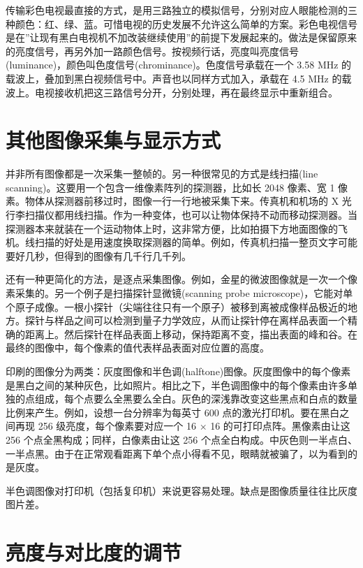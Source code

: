 传输彩色电视最直接的方式，是用三路独立的模拟信号，分别对应人眼能检测的三种颜色：红、绿、蓝。可惜电视的历史发展不允许这么简单的方案。彩色电视信号是在''让现有黑白电视机不加改装继续使用''的前提下发展起来的。做法是保留原来的亮度信号，再另外加一路颜色信号。按视频行话，亮度叫亮度信号(luminance)，颜色叫色度信号(chrominance)。色度信号承载在一个
3.58 MHz 的载波上，叠加到黑白视频信号中。声音也以同样方式加入，承载在
4.5 MHz
的载波上。电视接收机把这三路信号分开，分别处理，再在最终显示中重新组合。

\section{其他图像采集与显示方式}

并非所有图像都是一次采集一整帧的。另一种很常见的方式是线扫描(line
scanning)。这要用一个包含一维像素阵列的探测器，比如长 2048 像素、宽 1
像素。物体从探测器前移过时，图像一行一行地被采集下来。传真机和机场的 X
光行李扫描仪都用线扫描。作为一种变体，也可以让物体保持不动而移动探测器。当探测器本来就装在一个运动物体上时，这非常方便，比如拍摄下方地面图像的飞机。线扫描的好处是用速度换取探测器的简单。例如，传真机扫描一整页文字可能要好几秒，但得到的图像有几千行几千列。

还有一种更简化的方法，是逐点采集图像。例如，金星的微波图像就是一次一个像素采集的。另一个例子是扫描探针显微镜(scanning
probe
microscope)，它能对单个原子成像。一根小探针（尖端往往只有一个原子）被移到离被成像样品极近的地方。探针与样品之间可以检测到量子力学效应，从而让探针停在离样品表面一个精确的距离上。然后探针在样品表面上移动，保持距离不变，描出表面的峰和谷。在最终的图像中，每个像素的值代表样品表面对应位置的高度。

印刷的图像分为两类：灰度图像和半色调(halftone)图像。灰度图像中的每个像素是黑白之间的某种灰色，比如照片。相比之下，半色调图像中的每个像素由许多单独的点组成，每个点要么全黑要么全白。灰色的深浅靠改变这些黑点和白点的数量比例来产生。例如，设想一台分辨率为每英寸
600 点的激光打印机。要在黑白之间再现 256 级亮度，每个像素要对应一个 16 ×
16 的可打印点阵。黑像素由让这 256 个点全黑构成；同样，白像素由让这 256
个点全白构成。中灰色则一半点白、一半点黑。由于在正常观看距离下单个点小得看不见，眼睛就被骗了，以为看到的是灰度。

半色调图像对打印机（包括复印机）来说更容易处理。缺点是图像质量往往比灰度图片差。

\section{亮度与对比度的调节}

